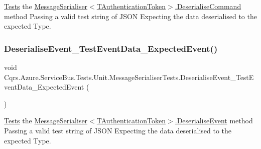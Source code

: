 \hyperlink{namespaceCqrs_1_1Azure_1_1ServiceBus_1_1Tests}{Tests} the \hyperlink{classCqrs_1_1Azure_1_1ServiceBus_1_1MessageSerialiser_a7cbab381f4758f8dd04cd17e2c5f2c3a_a7cbab381f4758f8dd04cd17e2c5f2c3a}{Message\+Serialiser$<$\+T\+Authentication\+Token$>$.\+Deserialise\+Command} method Passing a valid test string of J\+S\+ON Expecting the data deserialised to the expected Type. 

\mbox{\label{classCqrs_1_1Azure_1_1ServiceBus_1_1Tests_1_1Unit_1_1MessageSerialiserTests_ad7bc69e1f1d8741b8520f76cc5e034c2_ad7bc69e1f1d8741b8520f76cc5e034c2}} 
\subsubsection{\texorpdfstring{Deserialise\+Event\+\_\+\+Test\+Event\+Data\+\_\+\+Expected\+Event()}{DeserialiseEvent\_TestEventData\_ExpectedEvent()}}
{\footnotesize\ttfamily void Cqrs.\+Azure.\+Service\+Bus.\+Tests.\+Unit.\+Message\+Serialiser\+Tests.\+Deserialise\+Event\+\_\+\+Test\+Event\+Data\+\_\+\+Expected\+Event (\begin{DoxyParamCaption}{ }\end{DoxyParamCaption})}



\hyperlink{namespaceCqrs_1_1Azure_1_1ServiceBus_1_1Tests}{Tests} the \hyperlink{classCqrs_1_1Azure_1_1ServiceBus_1_1MessageSerialiser_a7b96e89475e9218fcb7a690fe4d02279_a7b96e89475e9218fcb7a690fe4d02279}{Message\+Serialiser$<$\+T\+Authentication\+Token$>$.\+Deserialise\+Event} method Passing a valid test string of J\+S\+ON Expecting the data deserialised to the expected Type. 

